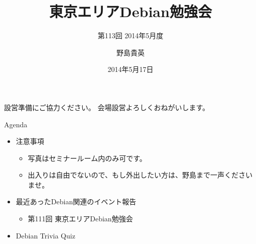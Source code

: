 \title{東京エリアDebian勉強会}
\subtitle{第113回 2014年5月度}
\author{野島貴英}
\date{2014年5月17日}



\begin{frame}
\titlepage{}
\end{frame}

\begin{frame}{設営準備にご協力ください。}
会場設営よろしくおねがいします。
\end{frame}

\begin{frame}{Agenda}
 \begin{minipage}[t]{0.45\hsize}
  \begin{itemize}
   \item 注意事項
	 \begin{itemize}
	  \item 写真はセミナールーム内のみ可です。
          \item 出入りは自由でないので、もし外出したい方は、野島まで一声くださいませ。
	 \end{itemize}
   \item 最近あったDebian関連のイベント報告
	 \begin{itemize}
	  \item 第111回 東京エリアDebian勉強会
	 \end{itemize}
  \end{itemize}
 \end{minipage} 
 \begin{minipage}[t]{0.45\hsize}
  \begin{itemize}
   \item Debian Trivia Quiz
  \end{itemize}
 \end{minipage}
\end{frame}

